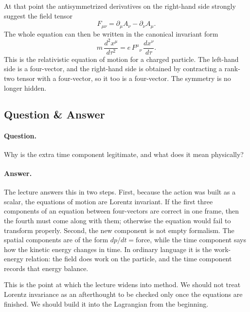 At that point the antisymmetrized derivatives on the right-hand side strongly suggest the field tensor
\begin{equation}
F_{\mu\nu}=\partial_\mu A_\nu-\partial_\nu A_\mu.
\end{equation}
The whole equation can then be written in the canonical invariant form
\begin{equation}
m\,\frac{d^2x^\mu}{d\tau^2}
=
e\,F^\mu{}_\nu\,\frac{dx^\nu}{d\tau}.
\end{equation}
This is the relativistic equation of motion for a charged particle. The left-hand side is a four-vector, and the right-hand side is obtained by contracting a rank-two tensor with a four-vector, so it too is a four-vector. The symmetry is no longer hidden.

\subsection{Question \& Answer}

\paragraph{Question.} Why is the extra time component legitimate, and what does it mean physically?

\paragraph{Answer.} The lecture answers this in two steps. First, because the action was built as a scalar, the equations of motion are Lorentz invariant. If the first three components of an equation between four-vectors are correct in one frame, then the fourth must come along with them; otherwise the equation would fail to transform properly. Second, the new component is not empty formalism. The spatial components are of the form $dp/dt=\text{force}$, while the time component says how the kinetic energy changes in time. In ordinary language it is the work-energy relation: the field does work on the particle, and the time component records that energy balance.

This is the point at which the lecture widens into method. We should not treat Lorentz invariance as an afterthought to be checked only once the equations are finished. We should build it into the Lagrangian from the beginning.


